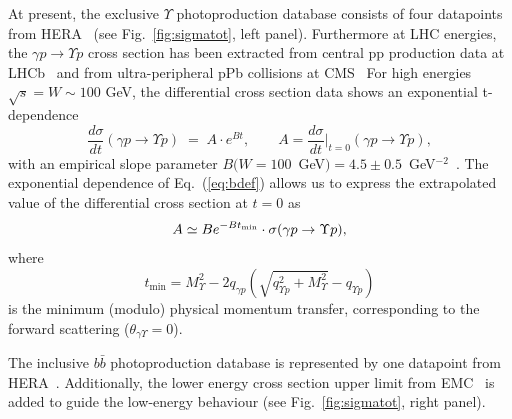 \documentclass[10pt,prd,aps,nofootinbib,superscriptaddress]{revtex4}
\newcommand{\beq}{\begin{equation}}
\newcommand{\eeq}{\end{equation}}
\begin{document}
At present, the exclusive $\Upsilon$ photoproduction database
consists of four datapoints from HERA~\cite{Adloff:2000vm, Breitweg:1998ki, Chekanov:2009zz}
(see Fig.~\ref{fig:sigmatot}, left panel). 
Furthermore at LHC energies, the $\gamma p \to \Upsilon p$ cross section has been extracted from central pp production data at LHCb~\cite{Aaij:2015kea} 
and from ultra-peripheral pPb collisions at  CMS~\cite{Sirunyan:2018sav}
For high energies $\sqrt{s} = W\sim100$ GeV, the differential cross section data shows an exponential t-dependence 
\beq
\frac{d \sigma}{dt} (\gamma p \to \Upsilon p)
\;=\; A \cdot e^{Bt}, \quad \quad 
A = \frac{d \sigma}{dt} \biggr|_{t = 0} (\gamma p \to \Upsilon p) ,
\label{eq:bdef}
\eeq
with an empirical slope parameter $B(W = 100$~GeV$)=4.5\pm0.5$~GeV$^{-2}$~\cite{Chekanov:2009zz}. 
The exponential dependence of Eq.~(\ref{eq:bdef}) allows us to express the extrapolated value
 of the differential cross section at $t=0$ as
\beq
A  \simeq B e^{- B t_{\rm min}} \cdot\sigma (\gamma p \to \Upsilon p),
\label{eq:brel}
\eeq
where
\beq
t_\mathrm{min} = M_\Upsilon^2 - 2q_{\gamma p} \left(\sqrt{q_{\Upsilon p}^2 + M_\Upsilon^2} - q_{\Upsilon p}\right)
\eeq
is the minimum (modulo) physical momentum transfer, corresponding to the forward scattering ($\theta_{\gamma \Upsilon}=0$).

The inclusive $b \bar b$ photoproduction database is represented by one datapoint from HERA~\cite{Adloff:1999nr}.
Additionally, the lower energy cross section upper limit from EMC~\cite{Aubert:1981gx}
is added to guide the low-energy behaviour (see Fig.~\ref{fig:sigmatot}, right panel).
\end{document}
